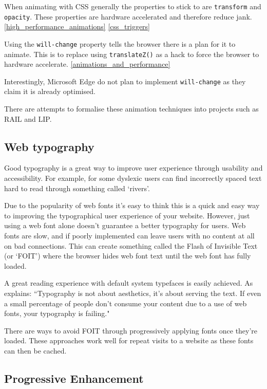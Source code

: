 When animating with CSS generally the properties to stick to are \verb|transform| and \verb|opacity|. These properties are hardware accelerated and therefore reduce jank. \ref{high_performance_animations} \ref{css_triggers}

Using the \verb|will-change| property tells the browser there is a plan for it to animate. This is to replace using \verb|translateZ()| as a hack to force the browser to hardware accelerate. \ref{animations_and_performance}

Interestingly, Microsoft Edge do not plan to implement \verb|will-change| as they claim it is already optimised. \cite{will_change_edge}

There are attempts to formalise these animation techniques into projects such as RAIL and LIP. \cite{introducing_RAIL} \cite{FLIP}

\subsection{Web typography} \label{l-r--web-type}

Good typography is a great way to improve user experience through usability and accessibility. For example, for some dyslexic users can find incorrectly spaced text hard to read through something called `rivers'. \cite{dyslexia}

Due to the popularity of web fonts it's easy to think this is a quick and easy way to improving the typographical user experience of your website. However, just using a web font alone doesn't guarantee a better typography for users. Web fonts are slow, and if poorly implemented can leave users with no content at all on bad connections. This can create something called the Flash of Invisible Text (or `FOIT') where the browser hides web font text until the web font has fully loaded. \cite{FOIT}

A great reading experience with default system typefaces is easily achieved. As \cite{against_webfonts} explains: ``Typography is not about aesthetics, it's about serving the text. If even a small percentage of people don't consume your content due to a use of web fonts, your typography is failing."

There are ways to avoid FOIT through progressively applying fonts once they're loaded. These approaches work well for repeat visits to a website as these fonts can then be cached. \cite{FOIT}

\subsection{Progressive Enhancement} \label{l-r--progressive-enhancement}

